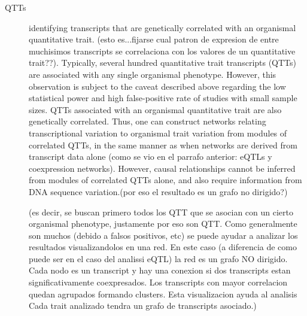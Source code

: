 \documentclass[a4paper,10pt]{article}
\begin{document}
\begin{description}
\begin{description}
\item[QTTs] identifying transcripts that are genetically correlated with an organismal quantitative trait. (esto es...fijarse cual patron de expresion de entre muchisimos transcripts se correlaciona con los valores de un quantitative trait??).
Typically, several hundred quantitative trait transcripts (QTTs) are associated with any single organismal phenotype.
However, this observation is subject to the caveat described above regarding the low statistical power and high false-positive rate of studies with small sample sizes.
QTTs associated with an organismal quantitative trait are also genetically correlated. 
Thus, one can construct networks relating transcriptional variation to organismal trait variation from modules of correlated QTTs, in the same manner as when networks are derived from transcript data alone (como se vio en el parrafo anterior: eQTLs y coexpression networks).
However, causal relationships cannot be inferred from modules of correlated QTTs alone, and also require information from DNA sequence variation.(por eso el resultado es un grafo no dirigido?)

(es decir, se buscan primero todos los QTT que se asocian con un cierto organismal phenotype, justamente por eso son QTT. Como generalmente son muchos (debido a falsos positivos, etc) se puede ayudar a analizar los resultados visualizandolos en una red. 
En este caso (a diferencia de como puede ser en el caso del analissi eQTL) la red es un grafo NO dirigido. Cada nodo es un transcript y hay una conexion si dos transcripts estan significativamente coexpresados. 
Los transcripts con mayor correlacion quedan agrupados formando clusters. Esta visualizacion ayuda al analisis
Cada trait analizado tendra un grafo de transcripts asociado.)
\end{description}


\end{description}
\end{document}
